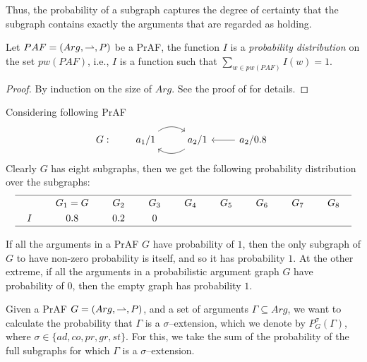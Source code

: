 Thus, 
the probability of a subgraph captures the degree of certainty that the subgraph contains exactly the arguments that are regarded as holding.


\begin{thm}
    Let $PAF=(Arg,\rightharpoonup,P)$ be a PrAF, 
    the function $I$ is a \textit{probability distribution} on the set $pw(PAF)$, 
    i.e., 
    $I$ is a function such that 
    $\sum_{w \in pw(PAF)} I(w) = 1$.
\end{thm}
\begin{proof}
    By induction on the size of $Arg$. 
    See the proof of \cite[Prop.~3 in p.~60]{Hun2013} for details.
\end{proof}




\begin{example}
    Considering following PrAF 
    \[G: \qquad 
    \begin{tikzcd}
        a_1/ 1 \arrow[r, bend left=35] & a_2 / 1 \arrow[l, bend left=35] & a_2 / 0.8 \arrow[l]
    \end{tikzcd}\]
    Clearly $G$ has eight subgraphs, 
    then we get the following probability distribution over the subgraphs:
    \[
      \renewcommand{\arraystretch}{1.3} %
      \renewcommand{\arraycolsep}{1.2em} %
    \begin{array}{ccccccccc}
        \hline 
        & G_1 = G & G_2 & G_3 & G_4 & G_5 & G_6 & G_7 & G_8 \\ 
        
        I 
        & 0.8 & 0.2 & 0  \\
        \hline
    \end{array}
    \]
\end{example}




If all the arguments in a PrAF $G$ have probability of $1$, 
then the only subgraph of $G$ to have non-zero probability is itself, 
and so it has probability $1$. 
% 
At the other extreme,
if all the arguments in a probabilistic argument graph $G$ have probability of $0$, 
then the empty graph has probability $1$.








\vspace{3em}


Given a PrAF  $G = (Arg,\rightharpoonup,P)$, 
and a set of arguments $\Gamma \subseteq Arg$, 
we want to calculate the probability that $\Gamma$ is a $\sigma$--extension, 
which we denote by {\color{purple} $P^\sigma_G(\Gamma)$},
where $\sigma \in \{ad, co, pr, gr, st\}$. 
For this, we take the sum of the probability of the full subgraphs for which $\Gamma$ is a $\sigma$--extension.



